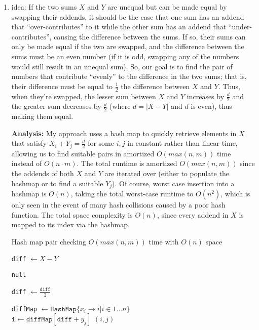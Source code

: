 \documentclass[12pt]{article}
\begin{document}
\begin{enumerate}
    \item idea: If the two sums $X$ and $Y$ are unequal but can be made equal by swapping their addends, it should be the 
    case that one sum has an addend that ``over-contributes'' to it while the other sum has an addend that ``under-contributes'', causing the 
    difference between the sums. If so, their sums can only be made equal if the two are swapped, and the difference between the sums must 
    be an even number (if it is odd, swapping any of the numbers would still result in an unequal sum). So, our goal is to 
    find the pair of numbers that contribute ``evenly'' to the difference in the two sums; that is, their difference must be 
    equal to $\frac{1}{2}$ the difference between $X$ and $Y$. Thus, when they're swapped, the lesser sum between $X$ and $Y$ 
    increases by $\frac{d}{2}$ and the greater sum decreases by $\frac{d}{2}$ (where $d = |X - Y|$ and $d$ is even), thus making them equal.

    \textbf{Analysis:} My approach uses a hash map to quickly retrieve elements in $X$ that satisfy $X_i + Y_j = \frac{d}{2}$ for some $i, j$ in 
    constant rather than linear time, allowing us to find suitable pairs in amortized $O(max(n, m))$ time instead of $O(n \cdot m)$.
    The total runtime is amortized $O(max(n, m))$ since the addends of both $X$ and $Y$ are iterated over (either to populate the hashmap or to find a suitable $Y_j$). Of course, worst 
    case insertion into a hashmap is $O(n)$, taking the total worst-case runtime to $O(n^2)$, which is only seen in the event of 
    many hash collisions caused by a poor hash function. The total space complexity is $O(n)$, since every addend in $X$ is mapped to its index via the hashmap.

    \begin{algorithm}
        \caption{Hash map pair checking $O(max(n, m))$ time with $O(n)$ space}
        \begin{algorithmic}
            \State \texttt{diff} $\gets X - Y$

                \State \Return \texttt{null}
            \EndIf

            \State \texttt{diff} $\gets \frac{\texttt{diff}}{2}$

            \State \texttt{diffMap} $ \gets \texttt{HashMap}\{x_i \rightarrow i | i \in 1 \dots n\}$\\

                    \State $\texttt{i} \gets \texttt{diffMap}[\texttt{diff} + y_j]$
                    \State \Return $(i, j)$
                \EndIf
            \EndFor
        \end{algorithmic}
    \end{algorithm}


\end{enumerate}
\end{document}

